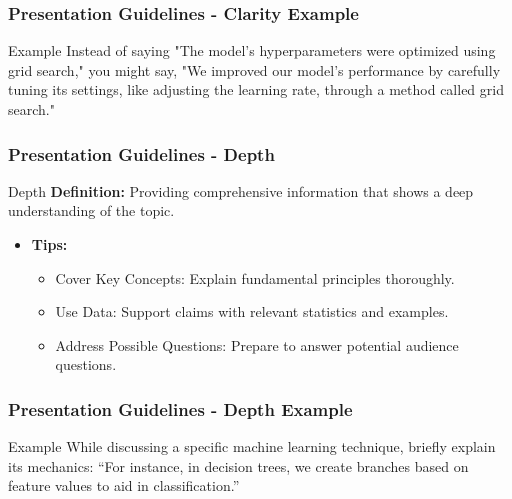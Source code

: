 \documentclass[aspectratio=169]{beamer}
\begin{document}
\begin{frame}[fragile]
    \frametitle{Presentation Guidelines - Clarity Example}
    \begin{block}{Example}
        Instead of saying "The model's hyperparameters were optimized using grid search," you might say, 
        "We improved our model's performance by carefully tuning its settings, like adjusting the learning rate, through a method called grid search."
    \end{block}
\end{frame}

\begin{frame}[fragile]
    \frametitle{Presentation Guidelines - Depth}
    \begin{block}{Depth}
        \textbf{Definition:} Providing comprehensive information that shows a deep understanding of the topic.
    \end{block}
    \begin{itemize}
        \item \textbf{Tips:}
        \begin{itemize}
            \item Cover Key Concepts: Explain fundamental principles thoroughly.
            \item Use Data: Support claims with relevant statistics and examples.
            \item Address Possible Questions: Prepare to answer potential audience questions.
        \end{itemize}
    \end{itemize}
\end{frame}

\begin{frame}[fragile]
    \frametitle{Presentation Guidelines - Depth Example}
    \begin{block}{Example}
        While discussing a specific machine learning technique, briefly explain its mechanics: 
        “For instance, in decision trees, we create branches based on feature values to aid in classification.”
    \end{block}
\end{frame}
\end{document}
